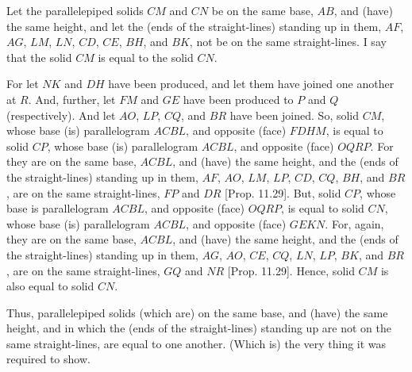 \begin{Parallel}{}{}
{\epsfysize=2.2in
\centerline{}

Let the parallelepiped solids $CM$ and $CN$ be on the same base, $AB$,
and (have) the same height, and let the (ends of the straight-lines)
standing up in them, $AF$, $AG$, $LM$, $LN$, $CD$, $CE$, $BH$,
and $BK$, not be on the same straight-lines. I say that the solid $CM$
is equal to the solid $CN$.

For let $NK$ and $DH$ have been produced, and let them have joined
one another at $R$. And, further, let $FM$ and $GE$ have been produced
to $P$ and $Q$ (respectively). And let $AO$, $LP$, $CQ$, and
$BR$ have been joined. So, solid $CM$, whose base (is)
parallelogram $ACBL$, and opposite (face) $FDHM$, is equal to solid
$CP$, whose base (is) parallelogram $ACBL$, and opposite
(face) $OQRP$. For they are on the same base, $ACBL$, and (have) the
same height, and the (ends of the straight-lines) standing up in them,
$AF$, $AO$, $LM$, $LP$, $CD$, $CQ$, $BH$, and $BR$, are on the
same straight-lines, $FP$ and $DR$ [Prop. 11.29]. 
But,  solid $CP$, whose base is parallelogram
$ACBL$, and opposite (face) $OQRP$, is equal to solid
$CN$, whose base (is) parallelogram $ACBL$, and opposite (face)
$GEKN$. For, again, they are on the same base, $ACBL$,
and (have) the same height, and the (ends of the straight-lines) standing up
in them, $AG$, $AO$, $CE$, $CQ$, $LN$, $LP$, $BK$, and $BR$,
are on the same straight-lines, $GQ$ and $NR$ [Prop. 11.29]. Hence, solid $CM$ is also equal to solid $CN$.

Thus, parallelepiped solids (which are) on the same base,
and (have) the same height, and in which the (ends of the straight-lines)
standing up are not on the same straight-lines, are equal to one another.
(Which is) the very thing it was required to show.}
\end{Parallel}

